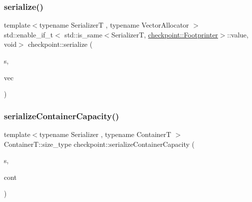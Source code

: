 \mbox{\label{namespacecheckpoint_af95ab4d3ad37bb33b284e3a51047d685}} 
\subsubsection{\texorpdfstring{serialize()}{serialize()}\hspace{0.1cm}{\footnotesize\ttfamily [29/29]}}
{\footnotesize\ttfamily template$<$typename SerializerT , typename Vector\+Allocator $>$ \\
std\+::enable\+\_\+if\+\_\+t$<$ std\+::is\+\_\+same$<$SerializerT, \hyperlink{structcheckpoint_1_1_footprinter}{checkpoint\+::\+Footprinter}$>$\+::value, void$>$ checkpoint\+::serialize (\begin{DoxyParamCaption}\item[{SerializerT \&}]{s,  }\item[{std\+::vector$<$ bool, Vector\+Allocator $>$ \&}]{vec }\end{DoxyParamCaption})}

\mbox{\label{namespacecheckpoint_abb25020fd55429c701342e79205a8d9a}} 
\subsubsection{\texorpdfstring{serialize\+Container\+Capacity()}{serializeContainerCapacity()}}
{\footnotesize\ttfamily template$<$typename Serializer , typename ContainerT $>$ \\
Container\+T\+::size\+\_\+type checkpoint\+::serialize\+Container\+Capacity (\begin{DoxyParamCaption}\item[{\hyperlink{structcheckpoint_1_1_serializer}{Serializer} \&}]{s,  }\item[{ContainerT \&}]{cont }\end{DoxyParamCaption})\hspace{0.3cm}{\ttfamily [inline]}}

\mbox{\label{namespacecheckpoint_a9c880ba9bb9a106e784e06554b2fbcf2}} 
